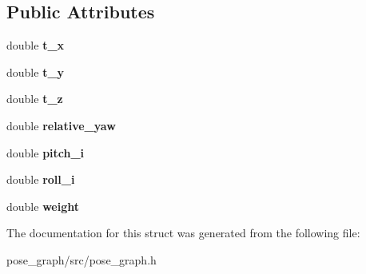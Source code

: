 \subsection*{Public Attributes}
\begin{DoxyCompactItemize}
\item 
\mbox{\label{structFourDOFWeightError_a7f9b0c6d082bcfcfb568d4b5ec3d4be7}} 
double {\bfseries t\+\_\+x}
\item 
\mbox{\label{structFourDOFWeightError_a45e7ebfefa16b03924b88789dd0ff37f}} 
double {\bfseries t\+\_\+y}
\item 
\mbox{\label{structFourDOFWeightError_af8fb0f9cac536c5dcebcd804d7ab81d9}} 
double {\bfseries t\+\_\+z}
\item 
\mbox{\label{structFourDOFWeightError_aa88bb0f5b492a1194866b65f75081c08}} 
double {\bfseries relative\+\_\+yaw}
\item 
\mbox{\label{structFourDOFWeightError_a7a42f3835fd1958988b158c3e98bd355}} 
double {\bfseries pitch\+\_\+i}
\item 
\mbox{\label{structFourDOFWeightError_a8d09c6c683f50aa82c5b56046eff7783}} 
double {\bfseries roll\+\_\+i}
\item 
\mbox{\label{structFourDOFWeightError_aea61325bc4b442e7370c0a5431d5f564}} 
double {\bfseries weight}
\end{DoxyCompactItemize}


The documentation for this struct was generated from the following file\+:\begin{DoxyCompactItemize}
\item 
pose\+\_\+graph/src/pose\+\_\+graph.\+h\end{DoxyCompactItemize}
